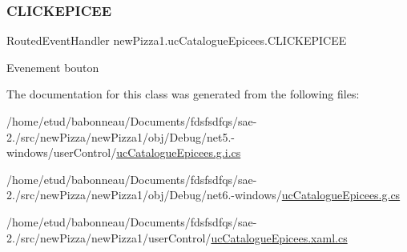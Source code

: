 \subsubsection{\texorpdfstring{C\+L\+I\+C\+K\+E\+P\+I\+C\+EE}{CLICKEPICEE}}
{\footnotesize\ttfamily Routed\+Event\+Handler new\+Pizza1.\+uc\+Catalogue\+Epicees.\+C\+L\+I\+C\+K\+E\+P\+I\+C\+EE}



Evenement bouton 



The documentation for this class was generated from the following files\+:\begin{DoxyCompactItemize}
\item 
/home/etud/babonneau/\+Documents/fdsfsdfqs/sae-\/2./src/new\+Pizza/new\+Pizza1/obj/\+Debug/net5.-\/windows/user\+Control/\hyperlink{net5_80-windows_2userControl_2ucCatalogueEpicees_8g_8i_8cs}{uc\+Catalogue\+Epicees.\+g.\+i.\+cs}\item 
/home/etud/babonneau/\+Documents/fdsfsdfqs/sae-\/2./src/new\+Pizza/new\+Pizza1/obj/\+Debug/net6.-\/windows/\hyperlink{Debug_2net6_80-windows_2ucCatalogueEpicees_8g_8cs}{uc\+Catalogue\+Epicees.\+g.\+cs}\item 
/home/etud/babonneau/\+Documents/fdsfsdfqs/sae-\/2./src/new\+Pizza/new\+Pizza1/user\+Control/\hyperlink{ucCatalogueEpicees_8xaml_8cs}{uc\+Catalogue\+Epicees.\+xaml.\+cs}\end{DoxyCompactItemize}
